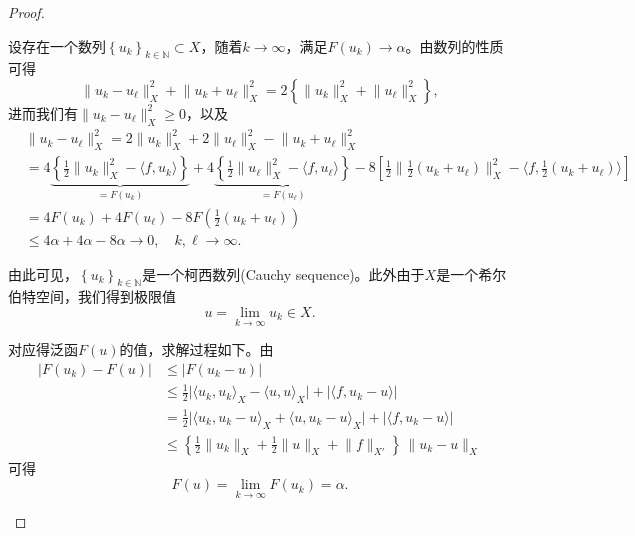 \begin{proof}
\begin{enumerate}
设存在一个数列$\left\{ u_k \right\}_{k \in \mathbb{N}} \subset X$，随着$k \rightarrow \infty$，满足$F(u_k) \rightarrow \alpha$。由数列的性质可得
\begin{equation*}
  \big\| u_k - u_\ell \big\|_{X}^2 + \big\| u_k + u_\ell \big\|_{X}^2= 2 \left\{
  \big\| u_k \big\|_{X}^{2} + \big\| u_\ell \big\|_{X}^{2}
  \right\},
\end{equation*}
进而我们有$\big\| u_k - u_\ell \big\|_{X}^2 \ge 0$，以及
\begin{equation*}
  \begin{split}
    &\big\| u_k - u_\ell \big\|_{X}^2 = 2   \big\| u_k  \big\|_{X}^2   + 2   \big\| u_\ell \big\|_{X}^2  -   \big\| u_k + u_\ell \big\|_{X}^2 \\
    &= 4 \underbrace{\left\{
    \frac{1}{2} \big\| u_k \big\|_{X}^2
    - \langle f, u_k \rangle
    \right\}}_{ = F(u_k)}
    + 4 \underbrace{\left\{
    \frac{1}{2} \big\| u_\ell \big\|_{X}^2
    - \langle f, u_{\ell} \rangle
    \right\}}_{ = F(u_{\ell})}
    - 8 \left[
    \frac{1}{2} \big\| \frac{1}{2} \left( u_k + u_{\ell} \right) \big\|_{X}^2
    - \langle f, \frac{1}{2} \left( u_k + u_{\ell} \right) \rangle
    \right]
    \\
    &=4 F(u_k) + 4 F(u_{\ell})
        - 8 F \left( \frac{1}{2} \left( u_k + u_{\ell} \right) \right)\\
    & \le 4 \alpha + 4 \alpha - 8 \alpha \rightarrow 0, \quad k,\ell \rightarrow \infty.
  \end{split}
\end{equation*}

由此可见，$\left\{ u_k \right\}_{k \in \mathbb{N}}$是一个柯西数列(Cauchy sequence)。此外由于$X$是一个希尔伯特空间，我们得到极限值
\begin{equation*}
  u = \lim_{k \rightarrow \infty} u_k \in X.
\end{equation*}

对应得泛函$F(u)$的值，求解过程如下。由
\begin{equation*}
  \begin{split}
    \left| F(u_k) - F(u) \right| & \le \big| F(u_k - u) \big| \\
    & \le
    \frac{1}{2} \big| \langle u_k, u_k \rangle_{X} - \langle u, u \rangle_{X} \big|
    + \big| \langle f, u_k - u \rangle  \big| \\
    & = \frac{1}{2}
    \big|
    \langle u_k, u_k - u \rangle_{X} + \langle u, u_k - u \rangle_{X}
    \big|
    + \big|
    \langle f, u_k - u \rangle
    \big| \\
    &\le \left\{
    \frac{1}{2} \big\| u_k \big\|_{X}
    + \frac{1}{2} \big\| u \big\|_{X}
    + \big\| f \big\|_{X'}
    \right\} \, \big\| u_k - u \big\|_{X}
  \end{split}
\end{equation*}
可得
\begin{equation*}
  F(u) = \lim_{k \rightarrow \infty} F(u_k) = \alpha.
\end{equation*}


\end{enumerate}
\end{proof}

